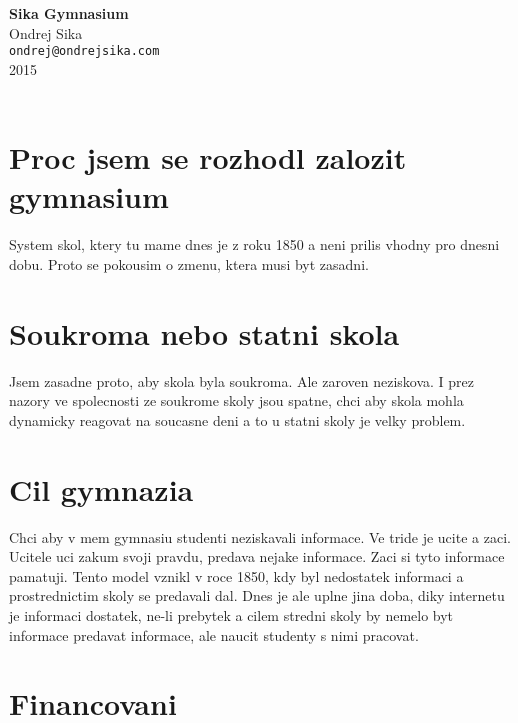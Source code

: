 \documentclass[12pt,a4paper]{article}
\begin{document}

\begin{center}
{\LARGE \bf Sika Gymnasium}\\
\vspace*{0.4cm}
{\large Ondrej Sika}\\
\vspace*{0.15cm}
{\tt ondrej@ondrejsika.com}\\
\vspace*{0.3cm}
{\small 2015}\\
\hrulefill\\
\end{center}


\section{Proc jsem se rozhodl zalozit gymnasium}

System skol, ktery tu mame dnes je z roku 1850 a neni prilis vhodny pro dnesni dobu. Proto se pokousim o zmenu, ktera musi byt zasadni.


\section{Soukroma nebo statni skola}

Jsem zasadne proto, aby skola byla soukroma. Ale zaroven neziskova. I prez nazory ve spolecnosti ze soukrome skoly jsou spatne, chci aby skola mohla dynamicky reagovat na soucasne deni a to u statni skoly je velky problem.


\section{Cil gymnazia}

Chci aby v mem gymnasiu studenti neziskavali informace. Ve tride je ucite a zaci. Ucitele uci zakum svoji pravdu, predava nejake informace. Zaci si tyto informace pamatuji. Tento model vznikl v roce 1850, kdy byl nedostatek informaci a prostrednictim skoly se predavali dal. Dnes je ale uplne jina doba, diky internetu je informaci dostatek, ne-li prebytek a cilem stredni skoly by nemelo byt informace predavat informace, ale naucit studenty s nimi pracovat.


\section{Financovani}
\end{document}
